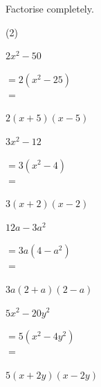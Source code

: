 \noindent%
Factorise completely.
\begin{tasks}(2)
    \task \begin{exercise}$2x^2-50$
              \begin{envSolution}
                 $ =2(x^2-25)   $\\ 
                 $ =$			 
                     \begin{shortsolution}
  	                    $ 2(x+5)(x-5)$
                     \end{shortsolution}
              \end{envSolution}%
          \end{exercise}
 
    \task \begin{exercise}$3x^2-12$
              \begin{envSolution}
                 $ =3(x^2-4)   $\\ 
                 $ =$			 
                     \begin{shortsolution}
  	                    $ 3(x+2)(x-2)$
                     \end{shortsolution}
              \end{envSolution}%
          \end{exercise}
 
    \task \begin{exercise}$12a-3a^2$
              \begin{envSolution}
                 $ =3a(4-a^2)   $\\ 
                 $ =$			 
                     \begin{shortsolution}
  	                    $ 3a(2+a)(2-a)$
                     \end{shortsolution}
              \end{envSolution}%
          \end{exercise}

    \task \begin{exercise}$5x^2-20y^2$
              \begin{envSolution}
                 $ =5(x^2-4y^2)   $\\
                 $ =$			 
                     \begin{shortsolution}
  	                    $ 5(x+2y)(x-2y)$
                     \end{shortsolution}
              \end{envSolution}%
          \end{exercise}
 

\end{tasks}
